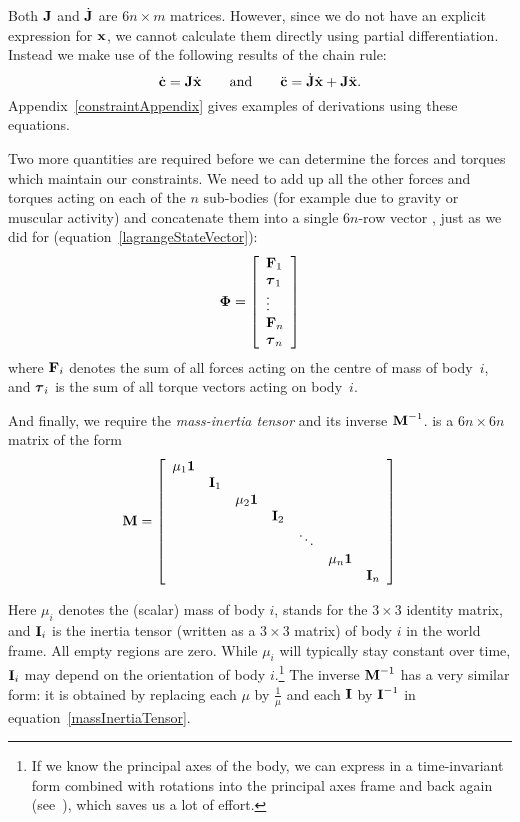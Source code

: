Both $\m{J}$ and $\dot{\m{J}}$ are $6n\times m$ matrices. However, since we do not
have an explicit expression for $\ve{x}$, we cannot calculate them directly using
partial differentiation. Instead we make use of the following results of the chain rule:
\begin{equation}
\label{cDotAndCDDot}
\dot{\ve{c}} = \m{J}\dot{\ve{x}} \quad\quad\mathrm{and}\quad\quad
\ddot{\ve{c}} = \dot{\m{J}}\dot{\ve{x}} + \m{J}\ddot{\ve{x}}.
\end{equation}
Appendix~\ref{constraintAppendix} gives examples of derivations using these equations.

Two more quantities are required before we can determine the forces and torques which maintain
our constraints. We need to add up all the other forces and torques acting on each of the $n$
sub-bodies (for example due to gravity or muscular activity) and concatenate them into a single
$6n$-row vector \ve{\Phi}, just as we did for  (equation~\ref{lagrangeStateVector}):
\begin{equation}
\ve{\Phi} = \left[\begin{array}{l}
    \ve{F}_1 \\ \ve{\tau}_1 \\ \vdots \\ \ve{F}_n \\ \ve{\tau}_n
    \end{array}\right]
\end{equation}
where $\ve{F}_i$ denotes the sum of all forces acting on the centre of mass of body~$i$, and
$\ve{\tau}_i$ is the sum of all torque vectors acting on body~$i$.

And finally, we require the {\em mass-inertia tensor}  and its inverse
$\m{M}^{-1}$.  is a $6n\times6n$ matrix of the form
\begin{equation}
\label{massInertiaTensor}
\m{M} = \left[ \begin{array}{ccccccc}
    \mu_1\m{1} \\ & \m{I}_1 \\ &&
    \mu_2\m{1} \\ &&& \m{I}_2 \\ &&&& \ddots \\ &&&&&
    \mu_n\m{1} \\ &&&&&& \m{I}_n
    \end{array}\right]
\end{equation}

Here $\mu_i$ denotes the (scalar) mass of body $i$,  stands for the $3\times3$
identity matrix, and $\m{I}_i$ is the inertia tensor (written as a $3\times3$ matrix)
of body $i$ in the world frame. All empty regions are zero. While $\mu_i$ will typically
stay constant over time, $\m{I}_i$ may depend on the orientation of body $i$.\footnote{If
we know the principal axes of the body, we can express  in a time-invariant
form combined with rotations into the principal axes frame and back again
(see~\cite{BaraffWitkin:97}), which saves us a lot of effort.} The inverse $\m{M}^{-1}$
has a very similar form: it is obtained by replacing each $\mu$ by $\frac{1}{\mu}$ and
each $\m{I}$ by $\m{I}^{-1}$ in equation~\ref{massInertiaTensor}.

